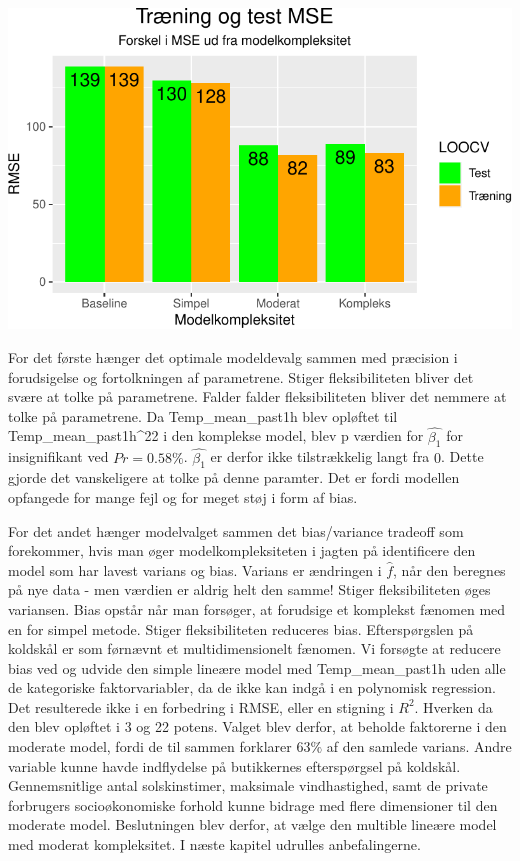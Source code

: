 \documentclass[
  12pt,
  a4paper,
  DIV=11,
  numbers=noendperiod]{scrartcl}
\begin{document}
\includegraphics{Semester_projekt_2022_G1_files/figure-pdf/Chunk 15 - Histgram over MSE-1.pdf}

For det første hænger det optimale modeldevalg sammen med præcision i
forudsigelse og fortolkningen af parametrene. Stiger fleksibiliteten
bliver det svære at tolke på parametrene. Falder falder fleksibiliteten
bliver det nemmere at tolke på parametrene. Da Temp\_mean\_past1h blev
opløftet til Temp\_mean\_past1h\^{}22 i den komplekse model, blev p
værdien for \(\hat{\beta_1}\) for insignifikant ved \(Pr = 0.58\%\).
\(\hat{\beta_1}\) er derfor ikke tilstrækkelig langt fra \(0\). Dette
gjorde det vanskeligere at tolke på denne paramter. Det er fordi
modellen opfangede for mange fejl og for meget støj i form af bias.

For det andet hænger modelvalget sammen det bias/variance tradeoff som
forekommer, hvis man øger modelkompleksiteten i jagten på identificere
den model som har lavest varians og bias. Varians er ændringen i
\(\hat{f}\), når den beregnes på nye data - men værdien er aldrig helt
den samme! Stiger fleksibiliteten øges variansen. Bias opstår når man
forsøger, at forudsige et komplekst fænomen med en for simpel metode.
Stiger fleksibiliteten reduceres bias. Efterspørgslen på koldskål er som
førnævnt et multidimensionelt fænomen. Vi forsøgte at reducere bias ved
og udvide den simple lineære model med Temp\_mean\_past1h uden alle de
kategoriske faktorvariabler, da de ikke kan indgå i en polynomisk
regression. Det resulterede ikke i en forbedring i RMSE, eller en
stigning i \(R^2\). Hverken da den blev opløftet i 3 og 22 potens.
Valget blev derfor, at beholde faktorerne i den moderate model, fordi de
til sammen forklarer \(63\%\) af den samlede varians. Andre variable
kunne havde indflydelse på butikkernes efterspørgsel på koldskål.
Gennemsnitlige antal solskinstimer, maksimale vindhastighed, samt de
private forbrugers socioøkonomiske forhold kunne bidrage med flere
dimensioner til den moderate model. Beslutningen blev derfor, at vælge
den multible lineære model med moderat kompleksitet. I næste kapitel
udrulles anbefalingerne.
\end{document}

